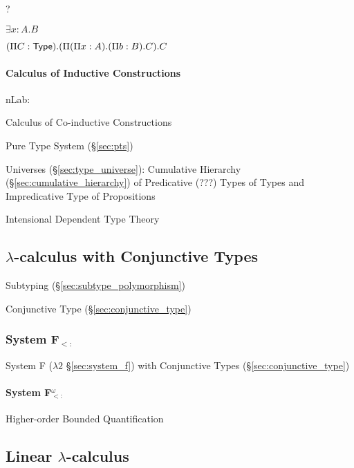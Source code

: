 ?


$\exists x:A.B$

$(\Pi C:\mathsf{Type}).(\Pi (\Pi x:A).(\Pi b:B).C).C$



\paragraph{Calculus of Inductive Constructions}\label{sec:cic}

nLab:

Calculus of Co-inductive Constructions

Pure Type System (\S\ref{sec:pts})

Universes (\S\ref{sec:type_universe}): Cumulative Hierarchy
(\S\ref{sec:cumulative_hierarchy}) of Predicative (???) Types of Types
and Impredicative Type of Propositions %

Intensional Dependent Type Theory



\subsection{$\lambda$-calculus with Conjunctive Types}
\label{sec:conjunctive_lambda}

Subtyping (\S\ref{sec:subtype_polymorphism})

Conjunctive Type (\S\ref{sec:conjunctive_type})



\subsubsection{System F$_{<:}$}\label{sec:system_fsub}

System F ($\lambda2$ \S\ref{sec:system_f}) with Conjunctive Types
(\S\ref{sec:conjunctive_type})



\paragraph{System F$_{<:}^\omega$}\label{sec:fsub_omega}\hfill

Higher-order Bounded Quantification



\subsection{Linear $\lambda$-calculus}\label{sec:linear_lambda}

